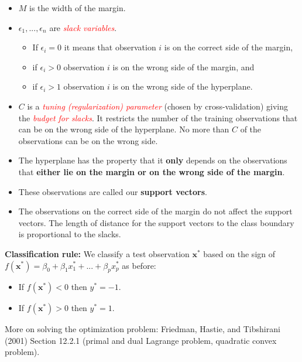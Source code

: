 \documentclass[10pt,ignorenonframetext,]{beamer}
\providecommand{\tightlist}{%
  \setlength{\itemsep}{0pt}\setlength{\parskip}{0pt}}
\begin{document}
\begin{frame}

\begin{itemize}
\item
  \(M\) is the width of the margin.
\item
  \(\epsilon_1,...,\epsilon_n\) are
  \emph{\textcolor{red}{slack variables}}.

  \begin{itemize}
  \tightlist
  \item
    If \(\epsilon_i=0\) it means that observation \(i\) is on the
    correct side of the margin,
  \item
    if \(\epsilon_i>0\) observation \(i\) is on the wrong side of the
    margin, and
  \item
    if \(\epsilon_i>1\) observation \(i\) is on the wrong side of the
    hyperplane.
  \end{itemize}
\item
  \(C\) is a \emph{\textcolor{red}{tuning (regularization) parameter}}
  (chosen by cross-validation) giving the
  \emph{\textcolor{red}{budget for slacks}}. It restricts the number of
  the training observations that can be on the wrong side of the
  hyperplane. No more than \(C\) of the observations can be on the wrong
  side.
\end{itemize}

\end{frame}

\begin{frame}

\begin{itemize}
\item
  The hyperplane has the property that it \textbf{only} depends on the
  observations that \textbf{either lie on the margin or on the wrong
  side of the margin}.
\item
  These observations are called our \textbf{support vectors}.
\item
  The observations on the correct side of the margin do not affect the
  support vectors. The length of distance for the support vectors to the
  class boundary is proportional to the slacks.
\end{itemize}

\end{frame}

\begin{frame}

\textbf{Classification rule:} We classify a test observation
\({\boldsymbol x}^*\) based on the sign of
\(f({\boldsymbol x}^*)=\beta_0+\beta_1 x_1^*+...+\beta_p x_p^*\) as
before:

\begin{itemize}
\tightlist
\item
  If \(f({\boldsymbol x}^*)<0\) then \(y^*=-1\).
\item
  If \(f({\boldsymbol x}^*)>0\) then \(y^*=1\).
\end{itemize}

More on solving the optimization problem: Friedman, Hastie, and
Tibshirani (2001) Section 12.2.1 (primal and dual Lagrange problem,
quadratic convex problem).

\end{frame}
\end{document}

